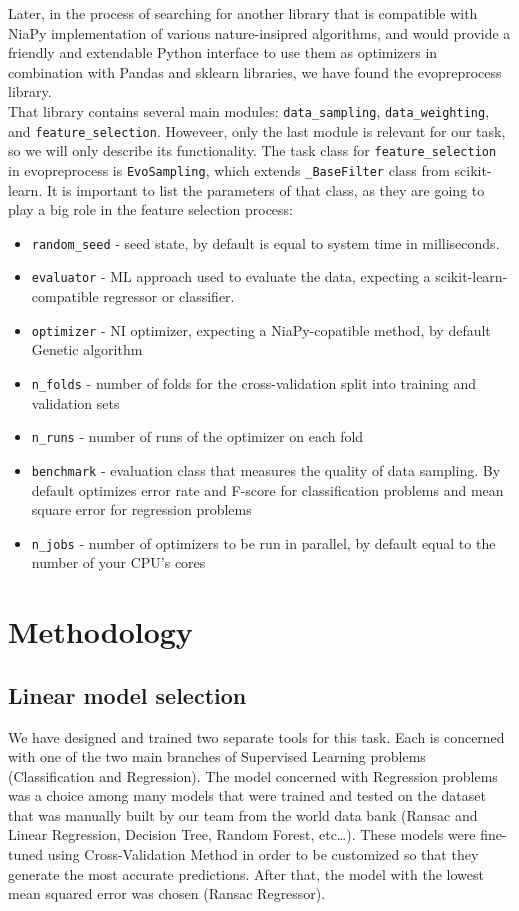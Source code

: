 \documentclass[conference]{IEEEtran}
\begin{document}
Later, in the process of searching for another library that is compatible with NiaPy implementation of various nature-insipred algorithms, and would provide a friendly and extendable Python interface to use them as optimizers in combination with Pandas and sklearn libraries, we have found the evopreprocess library\cite{evopreproc}. \\

That library contains several main modules: \texttt{data\_sampling}, \texttt{data\_weighting}, and \texttt{feature\_selection}. Howeveer, only the last module is relevant for our task, so we will only describe its functionality. The task class for \texttt{feature\_selection} in evopreprocess is \texttt{EvoSampling}, which extends \texttt{\_BaseFilter} class from scikit-learn. It is important to list the parameters of that class, as they are going to play a big role in the feature selection process:
\begin{itemize}
	\item \texttt{random\_seed} - seed state, by default is equal to system time in milliseconds.
	\item \texttt{evaluator} - ML approach used to evaluate the data, expecting a scikit-learn-compatible regressor or classifier.
	\item \texttt{optimizer} - NI optimizer, expecting a NiaPy-copatible method, by default Genetic algorithm
	\item \texttt{n\_folds} - number of folds for the cross-validation split into training and validation sets
	\item \texttt{n\_runs} - number of runs of the optimizer on each fold
	\item \texttt{benchmark} - evaluation class that measures the quality of data sampling. By default optimizes error rate and F-score for classification problems and mean square error for regression problems
	\item \texttt{n\_jobs} - number of optimizers to be run in parallel, by default equal to the number of your CPU's cores
\end{itemize}



\section{Methodology}

\subsection{Linear model selection}
We have designed and trained two separate tools for this task. Each is concerned with one of the two main branches of Supervised Learning problems (Classification and Regression).
The model concerned with Regression problems was a choice among many models that were trained and tested on the dataset that was manually built by our team from the world data bank (Ransac and Linear Regression, Decision Tree, Random Forest, etc…). These models were fine-tuned using Cross-Validation Method in order to be customized so that they generate the most accurate predictions. After that, the model with the lowest mean squared error was chosen (Ransac Regressor).\\
\end{document}

